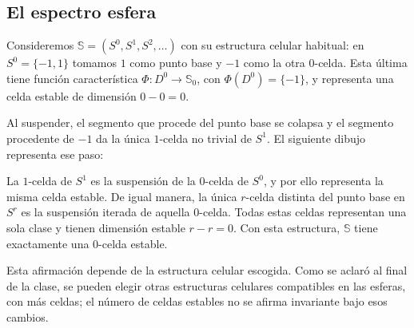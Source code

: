 \subsection{El espectro esfera}

Consideremos $\mathbb S=(S^0,S^1,S^2,\ldots)$ con su estructura celular habitual: en $S^0=\{-1,1\}$ tomamos $1$ como punto base y $-1$ como la otra $0$-celda. Esta última tiene función característica $\Phi\colon D^0\to\mathbb S_0$, con $\Phi(D^0)=\{-1\}$, y representa una celda estable de dimensión $0-0=0$.

Al suspender, el segmento que procede del punto base se colapsa y el segmento procedente de $-1$ da la única $1$-celda no trivial de $S^1$. El siguiente dibujo representa ese paso:
\begin{center}
\end{center}
La $1$-celda de $S^1$ es la suspensión de la $0$-celda de $S^0$, y por ello representa la misma celda estable. De igual manera, la única $r$-celda distinta del punto base en $S^r$ es la suspensión iterada de aquella $0$-celda. Todas estas celdas representan una sola clase y tienen dimensión estable $r-r=0$. Con esta estructura, $\mathbb S$ tiene exactamente una $0$-celda estable.

Esta afirmación depende de la estructura celular escogida. Como se aclaró al final de la clase, se pueden elegir otras estructuras celulares compatibles en las esferas, con más celdas; el número de celdas estables no se afirma invariante bajo esos cambios.
